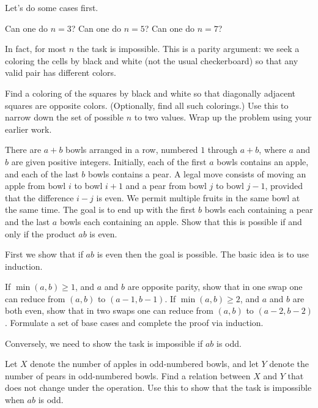 \begin{walkthrough}
	Let's do some cases first.
	\begin{walk}
		\ii Can one do $n=3$?
		\ii Can one do $n=5$?
		\ii Can one do $n=7$?
	\end{walk}
	In fact, for most $n$ the task is impossible.
	This is a parity argument:
	we seek a coloring the cells by black and white (not the usual checkerboard)
	so that any valid pair has different colors.
	\begin{walk}[resume]
		\ii Find a coloring of the squares by black and white
		so that diagonally adjacent squares are opposite colors.
		(Optionally, find all such colorings.)
		\ii Use this to narrow down the set
		of possible $n$ to two values.
		\ii Wrap up the problem using your earlier work.
	\end{walk}
\end{walkthrough}

\begin{example*}
	There are $a+b$ bowls arranged in a row,
	numbered $1$ through $a+b$,
	where $a$ and $b$ are given positive integers.
	Initially, each of the first $a$ bowls contains an apple,
	and each of the last $b$ bowls contains a pear.
	A legal move consists of moving an apple from bowl $i$ to bowl $i+1$
	and a pear from bowl $j$ to bowl $j-1$,
	provided that the difference $i-j$ is even.
	We permit multiple fruits in the same bowl at the same time.
	The goal is to end up with the first $b$ bowls each containing a pear
	and the last $a$ bowls each containing an apple.
	Show that this is possible if and only if the product $ab$ is even.
\end{example*} 

\begin{walkthrough}
	First we show that if $ab$ is even then the goal is possible.
	The basic idea is to use induction.
	\begin{walk}
		\ii If $\min(a,b) \ge 1$, and $a$ and $b$ are opposite parity,
		show that in one swap one can reduce from $(a,b)$ to $(a-1, b-1)$.
		\ii If $\min(a,b) \ge 2$, and $a$ and $b$ are both even,
		show that in two swaps one can reduce from $(a,b)$ to $(a-2, b-2)$.
		\ii Formulate a set of base cases and complete the proof via induction.
	\end{walk}
	Conversely, we need to show the task is impossible if $ab$ is odd.
	\begin{walk}[resume]
		\ii Let $X$ denote the number of apples in odd-numbered bowls,
		and let $Y$ denote the number of pears in odd-numbered bowls.
		Find a relation between $X$ and $Y$ that does not change under the operation.
		\ii Use this to show that the task is impossible when $ab$ is odd.
	\end{walk}
\end{walkthrough}

